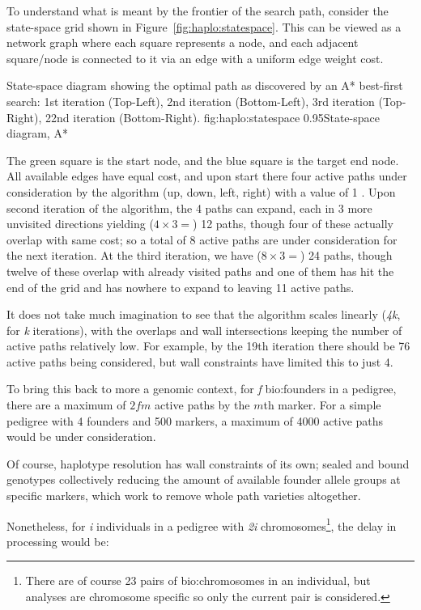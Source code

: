 To understand what is meant by the frontier of the search path, consider the state-space grid shown in Figure~\ref{fig:haplo:statespace}. This can be viewed as a network graph where each square represents a node, and each adjacent square/node is connected to it via an edge with a uniform edge weight cost.

\vspace{20pt}
	{State-space diagram showing the optimal path as discovered by an A* best-first search: 1st iteration (Top-Left), 2nd iteration (Bottom-Left), 3rd iteration (Top-Right), 22nd iteration (Bottom-Right).}
	{fig:haplo:statespace}
	{0.95}{State-space diagram, A*}
	
The green square is the start node, and the blue square is the target end node. All available edges have equal cost, and upon start there four active paths under consideration by the algorithm (up, down, left, right) with a value of 1 . Upon second iteration of the algorithm, the 4 paths can expand, each in 3 more unvisited directions yielding ($4 \times 3 = $) 12 paths, though four of these actually overlap with same cost; so a total of 8 active paths are under consideration for the next iteration. At the third iteration, we have ($8 \times 3 = $) 24 paths, though twelve of these overlap with already visited paths and one of them  has hit the end of the grid and has nowhere to expand to leaving 11 active paths.

It does not take much imagination to see that the algorithm scales linearly (\textit{4k}, for \textit{k} iterations), with the overlaps and wall intersections keeping the number of active paths relatively low. For example, by the 19th iteration there should be 76 active paths being considered, but wall constraints  have limited this to just 4.

To bring this back to more a genomic context, for \textit{f} \gls{bio:founders} in a pedigree, there are a maximum of $2fm$ active paths by the $m$th marker. For a simple pedigree with 4 founders and 500 markers, a maximum of 4000 active paths would be under consideration.

Of course, haplotype resolution has wall constraints of its own; sealed and bound genotypes  collectively reducing the amount of available founder allele groups at specific markers, which work to remove whole path varieties altogether.

Nonetheless, for \textit{i} individuals in a pedigree with \textit{2i} chromosomes\footnote{There are of course 23 pairs of \gls{bio:chromosomes} in an individual, but analyses are chromosome specific so only the current pair is considered.}, the delay in processing would be:

